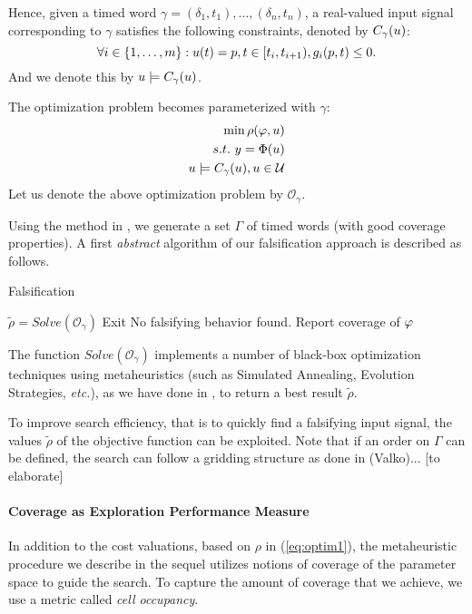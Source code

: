 Hence, given a timed word $\gamma = (\delta_1, t_1), \ldots, (\delta_n, t_n)$, a real-valued input signal corresponding to $\gamma$ satisfies the following constraints, denoted by $C_{\gamma}(u)$:
$$\forall i \in \{1, \ldots, m \}: u (t)= p, t \in [t_i, t_{i+1}), g_i(p,t)  \le 0.$$
And we denote this by $u \models C_{\gamma}(u)$.

The optimization problem becomes parameterized with $\gamma$:
\begin{eqnarray} \label{eq:optim2}
\min \rho(\varphi, u) \\ \nonumber
s.t. ~y=\Phi(u) \\ \nonumber
u \models C_{\gamma}(u), u \in \mathcal{U} \nonumber
\end{eqnarray}
Let us denote the above optimization problem by $\mathcal{O}_{\gamma}$.

Using the method in \cite{Cosmos}, we generate a set $\Gamma$ of timed words (with good coverage properties). A first {\em abstract} algorithm of our falsification approach is described as follows.
\begin{algorithm}
\caption{Falsification}
\begin{algorithmic}
	        \ForAll{$\gamma \in \Gamma$} 
		\State $\tilde{\rho} = Solve(\mathcal{O}_{\gamma})$
		  \State Exit	
		\EndIf
		\EndFor
		\State No falsifying behavior found. Report coverage of $\varphi$
\end{algorithmic}
\end{algorithm}
The function $Solve(\mathcal{O}_{\gamma})$ implements a number of black-box optimization techniques using metaheuristics (such as Simulated Annealing, Evolution Strategies, {\it etc.}), as we have done in \cite{}, to return a best result $\tilde{\rho}$. 

To improve search efficiency, that is to quickly find a falsifying input signal, the values $\tilde{\rho}$ of the objective function can be exploited. Note that if an order on $\Gamma$ can be defined, the search can follow a gridding structure as done in \cite{Valko2018} (Valko)... {\color{red} [to elaborate]}


\paragraph{Coverage as Exploration Performance Measure}	

In addition to the cost valuations, based on $\rho$ in (\ref{eq:optim1}),
the metaheuristic procedure we describe in the sequel utilizes notions of coverage of the parameter space to guide the search.
To capture the amount of coverage that we achieve, we use a metric called {\em cell occupancy}. 

